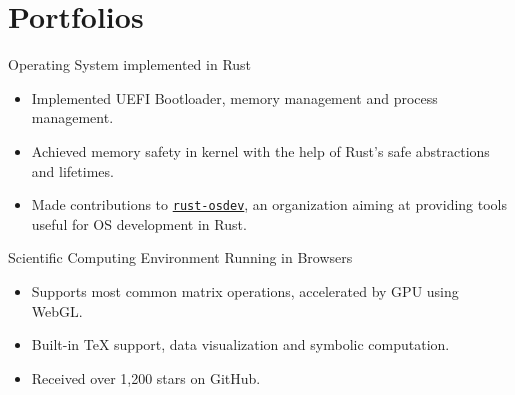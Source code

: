 \documentclass{resume}
\newcommand{\en}[1]{#1}
\newcommand{\zh}[1]{}
\begin{document}
\section{\en{Portfolios}\zh{个人项目}}
\en{Operating System implemented in Rust}
\zh{使用 Rust 编写的操作系统}
\begin{itemize}
      \item \en{Implemented UEFI Bootloader, memory management and process management.}
            \zh{实现了 UEFI Bootloader 、内存管理与进程管理。}
      \item \en{Achieved memory safety in kernel with the help of Rust's safe abstractions and lifetimes.}
            \zh{借助 Rust 的抽象能力与生命周期概念实现内核中的内存安全。}
      \item \en{Made contributions to \texttt{\href{https://github.com/rust-osdev}{rust-osdev}}, an organization aiming at providing tools useful for OS development in Rust.}
            \zh{为 Rust 操作系统开源组织 \texttt{\href{https://github.com/rust-osdev}{rust-osdev}} 贡献代码。}
\end{itemize}

\en{Scientific Computing Environment Running in Browsers}
\zh{完全在浏览器中运行的科学计算环境}
\begin{itemize}
      \item \en{Supports most common matrix operations, accelerated by GPU using WebGL.}
            \zh{支持大部分矩阵操作，并基于 WebGL 实现计算加速。}
      \item \en{Built-in TeX support, data visualization and symbolic computation.}
            \zh{内建 TeX 公式支持、数据可视化及符号计算。}
      \item \en{Received over 1,200 stars on GitHub.}
            \zh{在 GitHub 上收到超过 1,200 个 star。}
\end{itemize}
\end{document}

